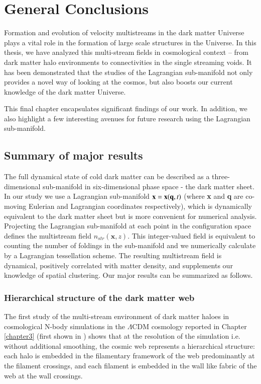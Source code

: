 
\chapter{General Conclusions}\label{chapter6}

Formation and evolution of velocity multistreams in the dark matter Universe plays a vital role in the formation of large scale structures in the Universe. In this thesis, we have analyzed this multi-stream fields in cosmological context -- from dark matter halo environments to connectivities in the single streaming voids. It has been demonstrated that the studies of the Lagrangian sub-manifold not only provides a novel way of looking at the cosmos, but also boosts our current knowledge of the dark matter Universe. 

This final chapter encapsulates significant findings of our work. In addition, we also highlight a few interesting avenues for future research using the Lagrangian sub-manifold.      

\section{Summary of major results}

The full dynamical state of cold dark matter can be described as a three-dimensional sub-manifold
in six-dimensional phase space - the dark matter sheet. In our study we use a Lagrangian sub-manifold ${\bf x} = {\bf x}({\bf q},t)$ 
(where {\bf x} and {\bf q} are co-moving Eulerian and Lagrangian coordinates respectively), which 
is dynamically  equivalent to the dark matter sheet but is more convenient for numerical analysis. Projecting the Lagrangian sub-manifold at each point in the configuration space defines the multistream field  $n_{str}(\mathbf{x}, z)$. This integer-valued field is equivalent to counting the number of foldings in the sub-manifold and we numerically calculate by a Lagrangian tessellation scheme. The resulting multistream field is dynamical, positively correlated with matter density, and supplements our knowledge of spatial clustering. Our major results can be summarized as follows.

\subsection{Hierarchical structure of the dark matter web}

The first study of the multi-stream environment of dark matter haloes in cosmological N-body simulations in the $\Lambda$CDM cosmology reported in Chapter \ref{chapter3} (first shown in \cite{Ramachandra2015}) shows that at the resolution of the simulation i.e. without additional smoothing, the cosmic web represents a hierarchical structure: each halo is embedded in the filamentary framework of the web predominantly  at the filament crossings, and each filament is embedded in the wall like fabric of the web at the wall crossings. 


